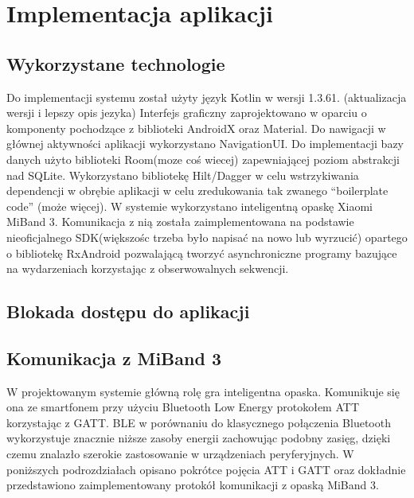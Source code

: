 \chapter{Implementacja aplikacji}
\thispagestyle{chapterBeginStyle}
\label{rozdzial3}

\section{Wykorzystane technologie}

Do implementacji systemu został użyty język Kotlin w wersji 1.3.61. (aktualizacja wersji i lepszy opis jezyka) Interfejs graficzny zaprojektowano w oparciu o komponenty pochodzące z biblioteki AndroidX oraz Material. Do nawigacji w głównej aktywności aplikacji wykorzystano NavigationUI. Do implementacji bazy danych użyto biblioteki Room(moze coś wiecej) zapewniającej poziom abstrakcji nad SQLite. Wykorzystano bibliotekę Hilt/Dagger w celu wstrzykiwania dependencji w obrębie aplikacji w celu zredukowania tak zwanego ``boilerplate code'' (może więcej).
\newline\newline
W systemie wykorzystano inteligentną opaskę Xiaomi MiBand 3. Komunikacja z nią została zaimplementowana na podstawie nieoficjalnego SDK(większośc trzeba było napisać na nowo lub wyrzucić) opartego o bibliotekę
RxAndroid pozwalającą tworzyć asynchroniczne programy bazujące na wydarzeniach korzystając z obserwowalnych sekwencji.

\section{Blokada dostępu do aplikacji}

\section{Komunikacja z MiBand 3}
W projektowanym systemie główną rolę gra inteligentna opaska. Komunikuje się ona ze smartfonem przy użyciu Bluetooth Low Energy protokołem ATT korzystając z GATT. BLE w porównaniu do klasycznego połączenia Bluetooth wykorzystuje znacznie niższe zasoby energii zachowując podobny zasięg, dzięki czemu znalazło szerokie zastosowanie w urządzeniach peryferyjnych. W poniższych podrozdziałach opisano pokrótce pojęcia ATT i GATT oraz dokładnie przedstawiono zaimplementowany protokół komunikacji z opaską MiBand 3.
